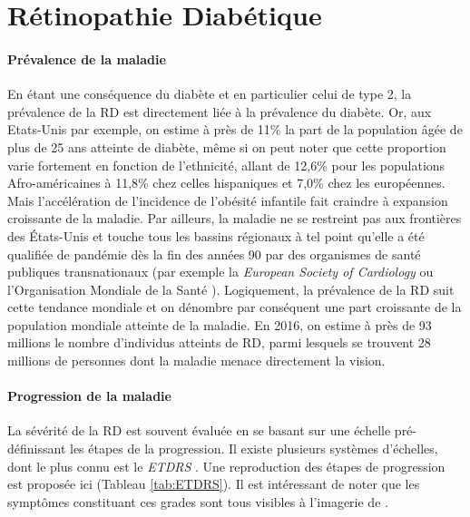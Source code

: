 

\label{sec:MaladiePrevalence}
\section{Rétinopathie Diabétique}

\paragraph{Prévalence de la maladie} En étant une conséquence du diabète et en particulier celui de type 2, la prévalence de la \ac{RD} est directement liée à la prévalence du diabète. Or, aux Etats-Unis par exemple, on estime à près de 11\% la part de la population âgée de plus de 25 ans atteinte de diabète, même si on peut noter que cette proportion varie fortement en fonction de l'ethnicité, allant de 12,6\% pour les populations Afro-américaines à 11,8\% chez celles hispaniques et 7,0\% chez les européennes. Mais l'accélération de l'incidence de l'obésité infantile fait craindre à expansion croissante de la maladie.
Par ailleurs, la maladie ne se restreint pas aux frontières des États-Unis et touche tous les bassins régionaux à tel point qu'elle a été qualifiée de pandémie dès la fin des années 90 par des organismes de santé publiques transnationaux (par  exemple la \textit{European Society of Cardiology} \cite{susanvanGlobalBurdenDiabetes2010} ou l'Organisation Mondiale de la Santé \cite{WorldHealthDay}).
Logiquement, la prévalence de la \ac{RD} suit cette tendance mondiale et on dénombre par conséquent une part croissante de la population mondiale atteinte de la maladie. En 2016, on estime à près de 93 millions le nombre d'individus atteints de \ac{RD}, parmi lesquels se trouvent 28 millions de personnes dont la maladie menace directement la vision.

\paragraph{Progression de la maladie} La sévérité de la \ac{RD} est souvent évaluée en se basant sur une échelle pré-définissant les étapes de la progression. Il existe plusieurs systèmes d'échelles, dont le plus connu est le \textit{\ac{ETDRS}} \cite{EarlyTreatmentDiabetic1991}. Une reproduction des étapes de progression est proposée ici (Tableau \ref{tab:ETDRS}). Il est intéressant de noter que les symptômes constituant ces grades sont tous visibles à l'imagerie de \fundus{}.

